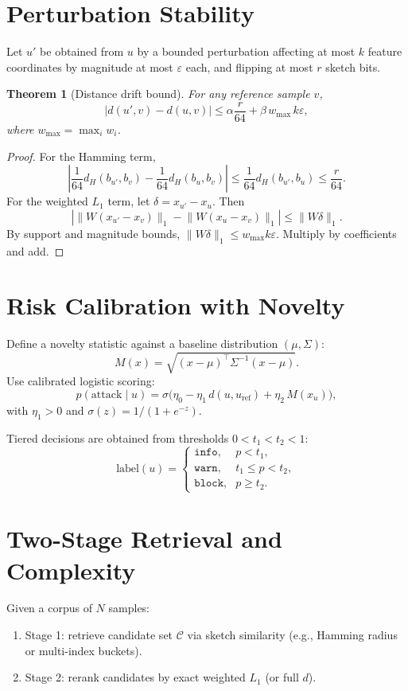\documentclass[11pt,a4paper]{article}
\newtheorem{theorem}{Theorem}
\begin{document}
\section{Perturbation Stability}
Let $u'$ be obtained from $u$ by a bounded perturbation affecting at most $k$ feature coordinates by magnitude at most $\varepsilon$ each, and flipping at most $r$ sketch bits.

\begin{theorem}[Distance drift bound]
For any reference sample $v$,
\[
|d(u',v)-d(u,v)| \le \alpha \frac{r}{64} + \beta\, w_{\max}\,k\varepsilon,
\]
where $w_{\max} = \max_i w_i$.
\end{theorem}

\begin{proof}
For the Hamming term,
\[
\left|\frac{1}{64}d_H(b_{u'},b_v)-\frac{1}{64}d_H(b_u,b_v)\right| \le \frac{1}{64}d_H(b_{u'},b_u) \le \frac{r}{64}.
\]
For the weighted $L_1$ term, let $\delta=x_{u'}-x_u$. Then
\[
\left|\lVert W(x_{u'}-x_v)\rVert_1 - \lVert W(x_u-x_v)\rVert_1\right|
\le \lVert W\delta\rVert_1.
\]
By support and magnitude bounds, $\lVert W\delta\rVert_1 \le w_{\max}k\varepsilon$. Multiply by coefficients and add.
\end{proof}

\section{Risk Calibration with Novelty}
Define a novelty statistic against a baseline distribution $(\mu,\Sigma)$:
\[
M(x)=\sqrt{(x-\mu)^\top \Sigma^{-1}(x-\mu)}.
\]
Use calibrated logistic scoring:
\[
p(\text{attack}\mid u)=\sigma\!\big(\eta_0-\eta_1\,d(u,u_\mathrm{ref})+\eta_2\,M(x_u)\big),
\]
with $\eta_1>0$ and $\sigma(z)=1/(1+e^{-z})$.

Tiered decisions are obtained from thresholds $0<t_1<t_2<1$:
\[
\text{label}(u)=
\begin{cases}
\texttt{info}, & p < t_1,\\
\texttt{warn}, & t_1 \le p < t_2,\\
\texttt{block}, & p \ge t_2.
\end{cases}
\]

\section{Two-Stage Retrieval and Complexity}
Given a corpus of $N$ samples:
\begin{enumerate}
    \item Stage 1: retrieve candidate set $\mathcal{C}$ via sketch similarity (e.g., Hamming radius or multi-index buckets).
    \item Stage 2: rerank candidates by exact weighted $L_1$ (or full $d$).
\end{enumerate}
\end{document}
